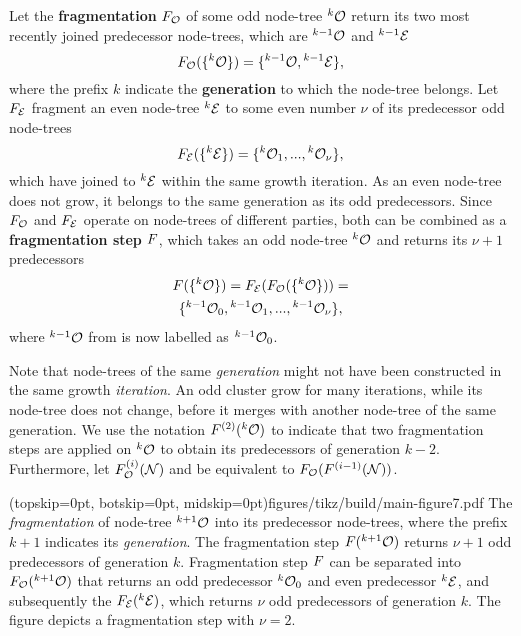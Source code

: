 \begin{definition}\label{def:fragmentation}
  
  Let the \textbf{fragmentation} $F_{\mathcal{O}}$ of some odd node-tree ${}^{k}\mathcal{O}$ return its two most recently joined predecessor node-trees, which are ${}^{k-1}\mathcal{O}$ and ${}^{k-1}\mathcal{E}$
  \begin{equation}\label{eq:pfo}
    F_{\mathcal{O}}(\{{}^{k}\mathcal{O}\}) = \{{}^{k-1}\mathcal{O}, {}^{k-1}\mathcal{E} \},
  \end{equation}
  where the prefix $k$ indicate the \textbf{generation} to which the node-tree belongs. Let $F_{\mathcal{E}}$ fragment an even node-tree ${}^{k}\mathcal{E}$ to some even number $\nu$ of its predecessor odd node-trees  
  \begin{equation}\label{eq:pfe}
    F_{\mathcal{E}}(\{{}^{k}\mathcal{E}\}) =\{{}^{k}\mathcal{O}_1,...,{}^{k}\mathcal{O}_{\nu} \},
  \end{equation}
  which have joined to ${}^{k}\mathcal{E}$ within the same growth iteration. As an even node-tree does not grow, it belongs to the same generation as its odd predecessors. Since $F_{\mathcal{O}}$ and $F_{\mathcal{E}}$ operate on node-trees of different parties, both can be combined as a \textbf{fragmentation step} $F$, which takes an odd node-tree ${}^{k}\mathcal{O}$ and returns its $\nu+1$ predecessors
  \begin{multline}\label{eq:fstep}
    F(\{{}^{k}\mathcal{O}\}) = F_{\mathcal{E}}(F_{\mathcal{O}}(\{{}^{k}\mathcal{O}\})) =  \\ \{{}^{k-1}\mathcal{O}_0,{}^{k-1}\mathcal{O}_1,...,{}^{k-1}\mathcal{O}_\nu\}, 
  \end{multline}
  where ${}^{k-1}\mathcal{O}$ from  is now labelled as ${}^{k-1}\mathcal{O}_0$.
\end{definition}

Note that node-trees of the same \emph{generation} might not have been constructed in the same growth \emph{iteration}. An odd cluster grow for many iterations, while its node-tree does not change, before it merges with another node-tree of the same generation. We use the notation $F^{(2)}({}^{k}\mathcal{O})$ to indicate that two fragmentation steps are applied on ${}^{k}\mathcal{O}$ to obtain its predecessors of generation $k-2$. Furthermore, let $F_{\mathcal{O}}^{(i)}(\mathcal{N})$ and be equivalent to $F_{\mathcal{O}}(F^{(i-1)}(\mathcal{N}))$. 

\Figure[hbt](topskip=0pt, botskip=0pt, midskip=0pt){figures/tikz/build/main-figure7.pdf}{
  The \emph{fragmentation} of node-tree ${}^{k+1}\mathcal{O}$ into its predecessor node-trees, where the prefix $k+1$ indicates its \emph{generation}. The fragmentation step $F({}^{k+1}\mathcal{O})$ returns $\nu+1$ odd predecessors of generation $k$. Fragmentation step $F$ can be separated into $F_{\mathcal{O}}({}^{k+1}\mathcal{O})$ that returns an odd predecessor ${}^{k}\mathcal{O}_0$ and even predecessor ${}^{k}\mathcal{E}$, and subsequently the $F_{\mathcal{E}}({}^{k}\mathcal{E})$, which returns $\nu$ odd predecessors of generation $k$. The figure depicts a fragmentation step with $\nu=2$.\label{fig6}}

